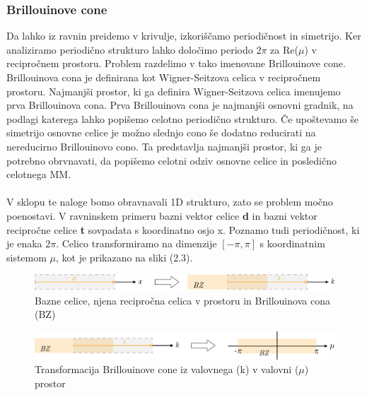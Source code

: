 \documentclass[12pt]{report}
\begin{document}
\subsubsection{Brillouinove cone}
Da lahko iz ravnin preidemo v krivulje, izkoriščamo periodičnost in simetrijo. Ker analiziramo periodično strukturo lahko določimo periodo 2$\pi$ za Re($\mu$) v recipročnem prostoru.
Problem razdelimo v tako imenovane Brillouinove cone. \cite{vanbelle}
\\Brillouinova cona je definirana kot Wigner-Seitzova celica v recipročnem prostoru. Najmanjši prostor, ki ga definira Wigner-Seitzova celica imenujemo prva Brillouinova cona.\cite{abhipod} Prva Brillouinova cona
je najmanjši osnovni gradnik, na podlagi katerega lahko popišemo celotno periodično strukturo. Če upoštevamo še simetrijo osnovne celice je možno slednjo cono še dodatno reducirati na nereducirno Brillouinovo cono. Ta predstavlja najmanjši prostor,
ki ga je potrebno obrvnavati, da popišemo celotni odziv osnovne celice in posledično celotnega \ac{MM}. \cite{kosir}
\\
\\
V sklopu te naloge bomo obravnavali 1D strukturo, zato se problem močno poenostavi. V ravninskem primeru bazni vektor celice \textbf{d} in bazni vektor recipročne celice \textbf{t} sovpadata s koordinatno osjo x. Poznamo tudi periodičnost, ki je enaka 2$\pi$. 
Celico transformiramo na dimenzije $[-\pi, \pi]$ s koordinatnim sistemom $\mu$, kot je prikazano na sliki (2.3).

\begin{figure}[H]
  \centering
  \includegraphics[scale=0.8]{Images/osnovna_celica.png}
  \caption{Bazne celice, njena recipročna celica v prostoru in Brillouinova cona (BZ)}
\end{figure}
\begin{figure}[H]
  \centering
  \includegraphics[scale=0.8]{Images/transformacija.png}
  \caption{Transformacija Brillouinove cone iz valovnega (k) v valovni ($\mu$) prostor}
\end{figure}
\end{document}
